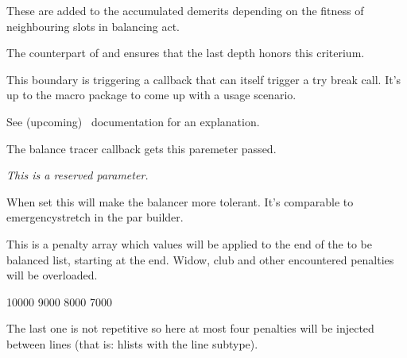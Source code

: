 \stopoldprimitive

\startnewprimitive[title={\prm {balanceadjdemerits}}]

These are added to the accumulated demerits depending on the fitness of
neighbouring slots in balancing act.

\stopnewprimitive

\startnewprimitive[title={\prm {balancebottomskip}}]

The counterpart of  and ensures that the last depth honors
this criterium.

\stopnewprimitive

\startnewprimitive[title={\prm {balanceboundary}}]

This boundary is triggering a callback that can itself trigger a try break call. It's up to
the macro package to come up with a usage scenario.

\stopnewprimitive

\startnewprimitive[title={\prm {balancebreakpasses}}]

See (upcoming) \CONTEXT\ documentation for an explanation.

\stopnewprimitive

\startnewprimitive[title={\prm {balancechecks}}]

The balance tracer callback gets this paremeter passed.

\stopnewprimitive

\startnewprimitive[title={\prm {balanceemergencyshrink}}]

{\em This is a reserved parameter.}

\stopnewprimitive

\startnewprimitive[title={\prm {balanceemergencystretch}}]

When set this will make the balancer more tolerant. It's comparable to \prm
{emergencystretch} in the par builder.

\stopnewprimitive

\startnewprimitive[title={\prm {balancefinalpenalties}}]

This is a penalty array which values will be applied to the end of the to be
balanced list, starting at the end. Widow, club and other encountered penalties
will be overloaded.

\starttyping
{}
    10000 9000 8000 7000
\relax
\stoptyping

The last one is not repetitive so here at most four penalties will be injected
between lines (that is: hlists with the line subtype).

